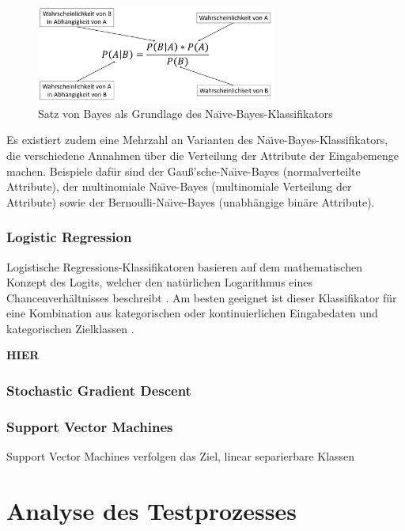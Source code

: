 \begin{figure}[]
    \centering
    \includegraphics[width=0.7\textwidth]{images/NB}
    \caption{Satz von Bayes als Grundlage des Na\"{\i}ve-Bayes-Klassifikators\label{fig:nb}}
\end{figure}

Es existiert zudem eine Mehrzahl an Varianten des Na\"{\i}ve-Bayes-Klassifikators, die verschiedene Annahmen über die Verteilung der Attribute der Eingabemenge machen. Beispiele dafür sind der Gauß'sche-Na\"{\i}ve-Bayes (normalverteilte Attribute), der multinomiale Na\"{\i}ve-Bayes (multinomiale Verteilung der Attribute) sowie der Bernoulli-Na\"{\i}ve-Bayes (unabhängige binäre Attribute).

\subsubsection*{Logistic Regression}
Logistische Regressions-Klassifikatoren basieren auf dem mathematischen Konzept des Logits, welcher den natürlichen Logarithmus eines Chancenverhältnisses beschreibt \cite{Peng2002}. Am besten geeignet ist dieser Klassifikator für eine Kombination aus kategorischen oder kontinuierlichen Eingabedaten und kategorischen Zielklassen \cite{Peng2002}.

\textbf{HIER}

\subsubsection*{Stochastic Gradient Descent}
\cite{Bottou2010}

\subsubsection*{Support Vector Machines}
Support Vector Machines verfolgen das Ziel, linear separierbare Klassen 
\cite{Tzotsos2006}

\section{Analyse des Testprozesses}

